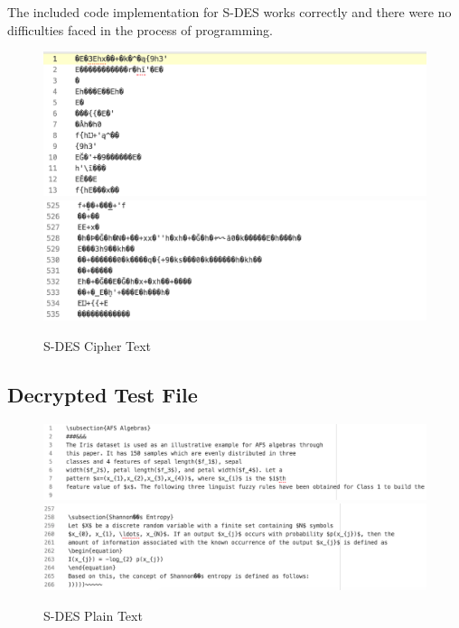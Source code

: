 \documentclass[]{article}
\begin{document}
The included code implementation for S-DES works correctly and there were no difficulties faced in the process of programming.

\begin{figure}[H]
	\includegraphics[height=\textheight/6,width=\textwidth]{sdes_cipher1.png}
	\includegraphics[height=\textheight/6,width=\textwidth]{sdes_cipher2.png}	
	\caption{S-DES Cipher Text}
	\centering
\end{figure}

\vspace{0.5cm}
\subsection*{Decrypted Test File}

\begin{figure}[H]
	\includegraphics[width=\textwidth]{sdes_plain1.png}
	\includegraphics[width=\textwidth]{sdes_plain2.png}	
	\caption{S-DES Plain Text}
	\centering
\end{figure}
\end{document}
